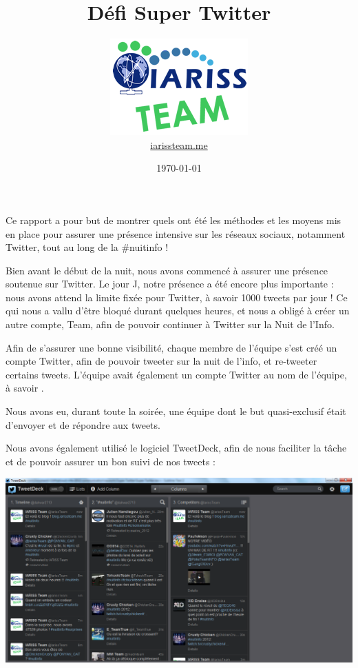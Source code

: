 \documentclass[12pt, a4paper]{article}
\title{Défi Super Twitter}
\newcommand{\espace}{\vspace{.8cm}}
\begin{document}
\author{\includegraphics{../_img/iariss_team.png} \\ {\sffamily \href{http://iarissteam.me}{iarissteam.me}}}
\date{\today}

\maketitle{}

{\sffamily Ce rapport a pour but de montrer quels ont été les méthodes et les moyens mis en place pour assurer une présence intensive sur les réseaux sociaux, notamment Twitter, tout au long de la \#nuitinfo !} 

\espace{}
Bien avant le début de la nuit, nous avons commencé à assurer une présence soutenue sur Twitter. Le jour J, notre présence a été encore plus importante : nous avons attend la limite fixée pour Twitter, à savoir 1000 tweets par jour ! Ce qui nous a vallu d'être bloqué durant quelques heures, et nous a obligé à créer un autre compte, \@TheIariss Team, afin de pouvoir continuer à Twitter sur la Nuit de l'Info.

Afin de s'assurer une bonne visibilité, chaque membre de l'équipe s'est créé un compte Twitter, afin de pouvoir tweeter sur la nuit de l'info, et re-tweeter certains tweets. L'équipe avait également un compte Twitter au nom de l'équipe, à savoir \@IarissTeam.

Nous avons eu, durant toute la soirée, une équipe dont le but quasi-exclusif était d'envoyer et de répondre aux tweets.

Nous avons également utilisé le logiciel TweetDeck, afin de nous faciliter la tâche et de pouvoir assurer un bon suivi de nos tweets : 

\espace{}
\begin{center}
\includegraphics[width=.9\textwidth, keepaspectratio=true]{img/tweetdeck.png}
\end{center}
\espace{}
\end{document}
